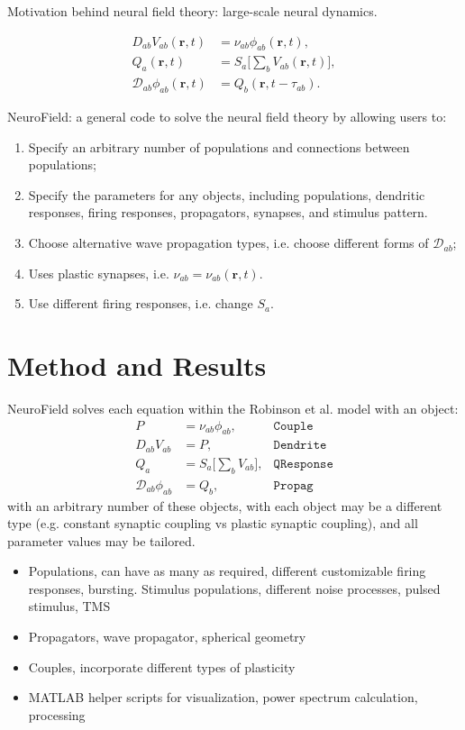 \documentclass[preprint,review,10pt,authoryear,letterpaper]{elsarticle}
\begin{document}
Motivation behind neural field theory: large-scale neural dynamics.

\begin{align*}
	D_{ab}V_{ab}(\mathbf{r},t) &= \nu_{ab}\phi_{ab}(\mathbf{r},t),\\
			Q_a(\mathbf{r},t) &= S_a \big[\sum_b V_{ab}(\mathbf{r},t) \big],\\
	\mathcal{D}_{ab}\phi_{ab}(\mathbf{r},t) &= Q_b(\mathbf{r},t-\tau_{ab}).
\end{align*}

NeuroField: a general code to solve the neural field theory by allowing users to:
\begin{enumerate}
	\item Specify an arbitrary number of populations and connections between populations;
	\item Specify the parameters for any objects, including populations, dendritic responses, firing responses, propagators, synapses, and stimulus pattern.
	\item Choose alternative wave propagation types, i.e. choose different forms of \(\mathcal{D}_{ab}\);
	\item Uses plastic synapses, i.e. \(\nu_{ab}=\nu_{ab}(\mathbf{r},t)\).
	\item Use different firing responses, i.e. change \(S_a\).
\end{enumerate}

\section{Method and Results}
\label{sec:theory}

NeuroField solves each equation within the Robinson et al. model with an object:
\begin{align*}
	P &= \nu_{ab}\phi_{ab}, & \mathtt{Couple}\\
	D_{ab}V_{ab} &= P, & \mathtt{Dendrite}\\
	Q_a &= S_a \big[\sum_b V_{ab} \big], & \mathtt{QResponse}\\
	\mathcal{D}_{ab}\phi_{ab} &= Q_b,&  \mathtt{Propag}
\end{align*}
with an arbitrary number of these objects, with each object may be a different type (e.g. constant synaptic coupling vs plastic synaptic coupling), and all parameter values may be tailored.

\begin{itemize}
\item Populations, can have as many as required, different customizable firing responses, bursting. Stimulus populations, different noise processes, pulsed stimulus, TMS
\item Propagators, wave propagator, spherical geometry
\item Couples, incorporate different types of plasticity
\item MATLAB helper scripts for visualization, power spectrum calculation, processing
\end{itemize}
\end{document}
